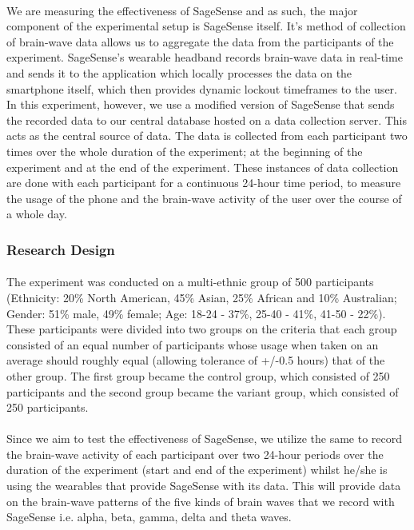 \documentclass{article}
\begin{document}
\paragraph{} We are measuring the effectiveness of SageSense and as such, the major component of the experimental setup is SageSense itself. It's method of collection of brain-wave data allows us to aggregate the data from the participants of the experiment. SageSense's wearable headband records brain-wave data in real-time and sends it to the application which locally processes the data on the smartphone itself, which then provides dynamic lockout timeframes to the user. In this experiment, however, we use a modified version of SageSense that sends the recorded data to our central database hosted on a data collection server. This acts as the central source of data. The data is collected from each participant two times over the whole duration of the experiment; at the beginning of the experiment and at the end of the experiment. These instances of data collection are done with each participant for a continuous 24-hour time period, to measure the usage of the phone and the brain-wave activity of the user over the course of a whole day.

\subsubsection{Research Design}

\paragraph{} The experiment was conducted on a multi-ethnic group of 500 participants (Ethnicity: 20\% North American, 45\% Asian, 25\% African and 10\% Australian; Gender: 51\% male, 49\% female; Age: 18-24 - 37\%, 25-40 - 41\%, 41-50 - 22\%). These participants were divided into two groups on the criteria that each group consisted of an equal number of participants whose usage when taken on an average should roughly equal (allowing tolerance of +/-0.5 hours) that of the other group. The first group became the control group, which consisted of 250 participants and the second group became the variant group, which consisted of 250 participants. 

\paragraph{} Since we aim to test the effectiveness of SageSense, we utilize the same to record the brain-wave activity of each participant over two 24-hour periods over the duration of the experiment (start and end of the experiment) whilst he/she is using the wearables that provide SageSense with its data. This will provide data on the brain-wave patterns of the five kinds of brain waves that we record with SageSense i.e. alpha, beta, gamma, delta and theta waves. 
\end{document}
